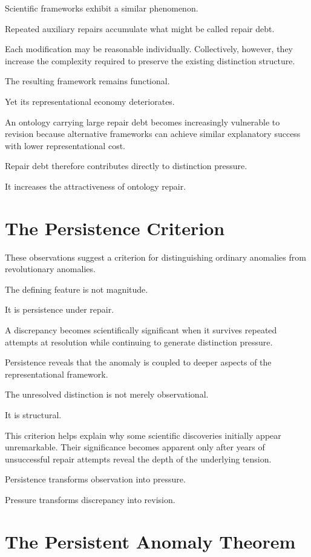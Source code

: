 \documentclass[11pt,oneside,openany]{book}
\begin{document}
Scientific frameworks exhibit a similar phenomenon.

Repeated auxiliary repairs accumulate what might be called repair debt.

Each modification may be reasonable individually. Collectively, however, they increase the complexity required to preserve the existing distinction structure.

The resulting framework remains functional.

Yet its representational economy deteriorates.

An ontology carrying large repair debt becomes increasingly vulnerable to revision because alternative frameworks can achieve similar explanatory success with lower representational cost.

Repair debt therefore contributes directly to distinction pressure.

It increases the attractiveness of ontology repair.

\section{The Persistence Criterion}

These observations suggest a criterion for distinguishing ordinary anomalies from revolutionary anomalies.

The defining feature is not magnitude.

It is persistence under repair.

A discrepancy becomes scientifically significant when it survives repeated attempts at resolution while continuing to generate distinction pressure.

Persistence reveals that the anomaly is coupled to deeper aspects of the representational framework.

The unresolved distinction is not merely observational.

It is structural.

This criterion helps explain why some scientific discoveries initially appear unremarkable. Their significance becomes apparent only after years of unsuccessful repair attempts reveal the depth of the underlying tension.

Persistence transforms observation into pressure.

Pressure transforms discrepancy into revision.

\section{The Persistent Anomaly Theorem}
\end{document}
